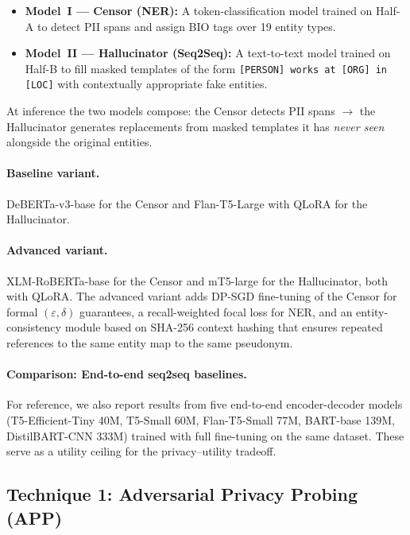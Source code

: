 \documentclass[11pt,a4paper]{article}
\begin{document}
\begin{itemize}
    \item \textbf{Model~I — Censor (NER):} A token-classification model trained
    on Half-A to detect PII spans and assign BIO tags over 19 entity types.
    \item \textbf{Model~II — Hallucinator (Seq2Seq):} A text-to-text model
    trained on Half-B to fill masked templates of the form
    \texttt{[PERSON] works at [ORG] in [LOC]} with contextually appropriate
    fake entities.
\end{itemize}

At inference the two models compose: the Censor detects PII spans $\rightarrow$
the Hallucinator generates replacements from masked templates it has
\emph{never seen} alongside the original entities.

\paragraph{Baseline variant.}
DeBERTa-v3-base \cite{he2021debertav3} for the Censor and
Flan-T5-Large \cite{chung2022scaling} with QLoRA \cite{dettmers2024qlora}
for the Hallucinator.

\paragraph{Advanced variant.}
XLM-RoBERTa-base \cite{conneau2020unsupervised} for the Censor and
mT5-large for the Hallucinator, both with QLoRA.  The advanced variant
adds DP-SGD \cite{abadi2016deep} fine-tuning of the Censor for formal
$(\varepsilon, \delta)$ guarantees, a recall-weighted focal loss for NER,
and an entity-consistency module based on SHA-256 context hashing that ensures
repeated references to the same entity map to the same pseudonym.

\paragraph{Comparison: End-to-end seq2seq baselines.}
For reference, we also report results from five end-to-end encoder-decoder
models (T5-Efficient-Tiny 40M, T5-Small 60M, Flan-T5-Small 77M, BART-base
139M, DistilBART-CNN 333M) trained with full fine-tuning on the same dataset.
These serve as a utility ceiling for the privacy--utility tradeoff.

\subsection{Technique 1: Adversarial Privacy Probing (APP)}
\label{sec:app}
\end{document}
